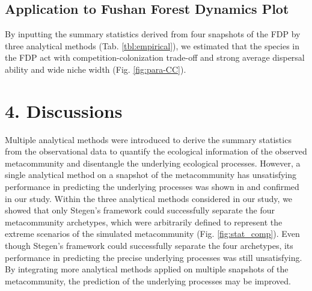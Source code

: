 	
	\section{Application to Fushan Forest Dynamics Plot}
	\noindent
	By inputting the summary statistics derived from four snapshots of the FDP by three analytical methods (Tab. \ref{tbl:empirical}), we estimated that the species in the FDP act with competition-colonization trade-off and strong average dispersal ability and wide niche width (Fig. \ref{fig:para-CC}). 
	
	
	\newpage
\chapter*{4. Discussions}
\setcounter{chapter}{4}
	\noindent
	Multiple analytical methods were introduced to derive the summary statistics from the observational data to quantify the ecological information of the observed metacommunity and disentangle the underlying ecological processes. However, a single analytical method on a snapshot of the metacommunity has unsatisfying performance in predicting the underlying processes was shown in \citet{guzman2022accounting} and confirmed in our study. Within the three analytical methods considered in our study, we showed that only Stegen's framework could successfully separate the four metacommunity archetypes, which were arbitrarily defined to represent the extreme scenarios of the simulated metacommunity (Fig. \ref{fig:stat_comp}). Even though Stegen's framework could successfully separate the four archetypes, its performance in predicting the precise underlying processes was still unsatisfying. By integrating more analytical methods applied on multiple snapshots of the metacommunity, the prediction of the underlying processes may be improved. 
	
